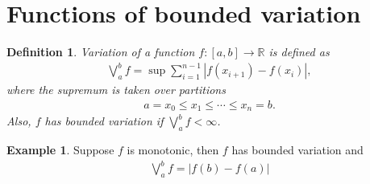 \documentclass[11pt]{book}
\newtheorem{definition}{Definition}[chapter]
\theoremstyle{definition}
\newtheorem{example}{Example}[chapter]
\numberwithin{equation}{chapter}
\begin{document}
\medskip

\section{Functions of bounded variation}

\begin{definition}
Variation of a function $f: [a,b] \to \mathbb{R}$ is defined as 
\begin{align*}
    \bigvee^b_a f = \sup \sum^{n-1}_{i=1} \left|f(x_{i+1}) - f(x_i)\right|,
\end{align*}
where the supremum is taken over partitions
\begin{align*}
    a = x_0 \leq x_1 \leq \cdots \leq x_n = b.
\end{align*}
Also, $f$ has bounded variation if $\bigvee^b_a f < \infty$.
\end{definition}

\medskip

\begin{example}
Suppose $f$ is monotonic, then $f$ has bounded variation and 
\begin{align*}
    \bigvee^b_a f = \left|f(b) - f(a)\right|
\end{align*}
\end{example}

\medskip
\end{document}
